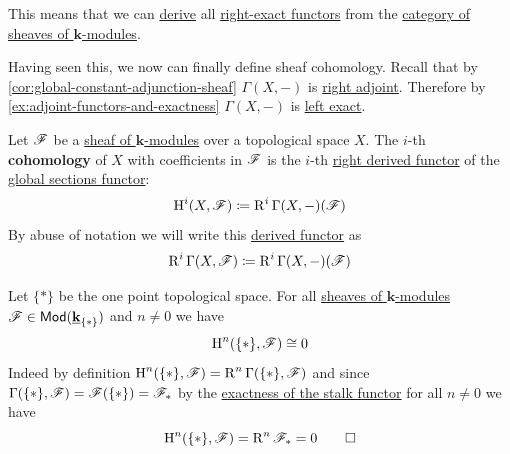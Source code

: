 \documentclass[../../main]{subfiles}
\begin{document}
This means that we can \hyperref[def:right-derived-functor]{derive} all \hyperref[def:exact-functor]{right-exact functors} from the \hyperref[def:sheaf]{category of sheaves of \(\mathbf{k}\)-modules}.

Having seen this, we now can finally define sheaf cohomology.
Recall that by \autoref{cor:global-constant-adjunction-sheaf} \(\Gamma(X, -)\) is \hyperref[def:adjoint-functors]{right adjoint}.
Therefore by \autoref{ex:adjoint-functors-and-exactness} \(\Gamma(X, -)\) is \hyperref[def:exact-functor]{left exact}.
\begin{definition}\label{def:sheaf-cohomology}
  Let \(\mathscr{F}\) be a \hyperref[def:sheaf]{sheaf of \(\mathbf{k}\)-modules} over a topological space \(X\).
  The \(i\)-th \textbf{cohomology} of \(X\) with coefficients in \(\mathscr{F}\) is the \(i\)-th \hyperref[def:right-derived-functor]{right derived functor} of the \hyperref[def:global-sections-sheaf]{global sections functor}:
  \begin{equation*}
    \operatorname{H}^{i}(X, \mathscr{F}) \coloneq \operatorname{R}^{i}\Gamma(X, -)(\mathscr{F})
  \end{equation*}
  By abuse of notation we will write this \hyperref[def:right-derived-functor]{derived functor} as
  \begin{equation*}
    \operatorname{R}^{i}\Gamma(X, \mathscr{F}) \coloneq \operatorname{R}^{i}\Gamma(X, -)(\mathscr{F})
  \end{equation*}
\end{definition}

\begin{example}\label{ex:cohomology-over-point}
  Let \(\{\ast\}\) be the one point topological space.
  For all \hyperref[def:sheaf]{sheaves of \(\mathbf{k}\)-modules} \(\mathscr{F} \in \mathsf{Mod}(\underline{\mathbf{k}}_{\{\ast\}})\) and \(n \neq 0\) we have
  \begin{equation*}
    \operatorname{H}^{n}(\{\ast\}, \mathscr{F}) \cong 0
  \end{equation*}
  Indeed by definition \(\operatorname{H}^{n}( \{\ast\}, \mathscr{F} ) = \operatorname{R}^{n} \Gamma(\{\ast\}, \mathscr{F})\) and since \(\Gamma(\{\ast\}, \mathscr{F}) = \mathscr{F}(\{\ast\}) = \mathscr{F}_{\ast}\) by the \hyperref[cor:exactness-at-stalks]{exactness of the stalk functor} for all \(n \neq 0\) we have
  \begin{equation*}
    \operatorname{H}^{n} (\{\ast\}, \mathscr{F}) = \operatorname{R}^{n} \mathscr{F}_{\ast} = 0 \qedhere
  \end{equation*}
\end{example}
\end{document}
